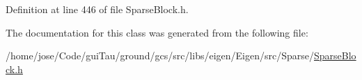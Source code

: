 Definition at line 446 of file Sparse\-Block.\-h.



The documentation for this class was generated from the following file\-:\begin{DoxyCompactItemize}
\item 
/home/jose/\-Code/gui\-Tau/ground/gcs/src/libs/eigen/\-Eigen/src/\-Sparse/\hyperlink{_sparse_block_8h}{Sparse\-Block.\-h}\end{DoxyCompactItemize}
